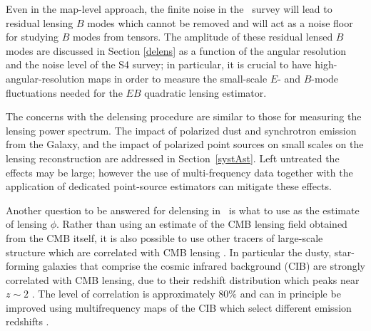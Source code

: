 
Even in the map-level approach, the finite noise in the \cmbexp\ survey will lead to residual lensing $B$ modes which cannot be removed and will act as a noise floor for studying $B$ modes from tensors.  The amplitude of these residual lensed $B$ modes are discussed in Section \ref{delens} as a function of the angular resolution and the noise level of the S4 survey; in particular, it is crucial to have high-angular-resolution maps in order to measure the small-scale $E$- and $B$-mode fluctuations needed for the $EB$ quadratic lensing estimator.

The concerns with the delensing procedure are similar to those for measuring the lensing power spectrum. The impact of polarized dust and synchrotron emission from the Galaxy, and the impact of polarized point sources on small scales on the lensing reconstruction are addressed in Section~\ref{systAst}. Left untreated the effects may be large; however the use of  multi-frequency data together with the application of dedicated point-source estimators can mitigate these effects.

Another question to be answered for delensing in \cmbexp\ is what to use as the estimate of lensing $\phi$.
Rather than using an estimate of the CMB lensing field obtained from the CMB itself, it is also possible to use other tracers of large-scale structure which are correlated with  CMB lensing \cite{Smith:2010gu}.  In particular the dusty, star-forming galaxies that comprise the cosmic infrared background (CIB) are strongly correlated with CMB lensing, due to their redshift distribution which peaks near $z \sim 2$ \cite{Sherwin:2015baa,Simard:2014aqa}.  The level of correlation is approximately $80\%$ \cite{Ade:2013lta} and can in principle be improved using multifrequency maps of the CIB which select different emission redshifts \cite{Sherwin:2015baa}.  

